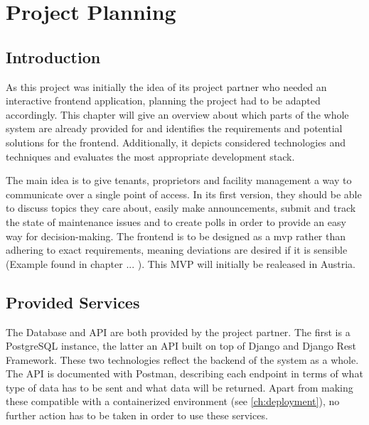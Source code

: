 \chapter[Project Planning]{Project Planning}

\section{Introduction}
As this project was initially the idea of its project partner who needed an interactive frontend application, planning the project had to be adapted accordingly. This chapter will give an overview about which parts of the whole system are already provided for and identifies the requirements and potential solutions for the frontend. Additionally, it depicts considered technologies and techniques and evaluates the most appropriate development stack.

The main idea is to give tenants, proprietors and facility management a way to communicate over a single point of access. In its first version, they should be able to discuss topics they care about, easily make announcements, submit and track the state of maintenance issues and to create polls in order to provide an easy way for decision-making. The frontend is to be designed as a \acrfull{mvp} rather than adhering to exact requirements, meaning deviations are desired if it is sensible (Example found in chapter ... ). This MVP will initially be realeased in Austria.

\section{Provided Services}
The Database and API are both provided by the project partner. The first is a PostgreSQL instance, the latter an API built on top of Django and Django Rest Framework. These two technologies reflect the backend of the system as a whole. The API is documented with Postman, describing each endpoint in terms of what type of data has to be sent and what data will be returned. Apart from making these compatible with a containerized environment (see \autoref{ch:deployment}), no further action has to be taken in order to use these services.

